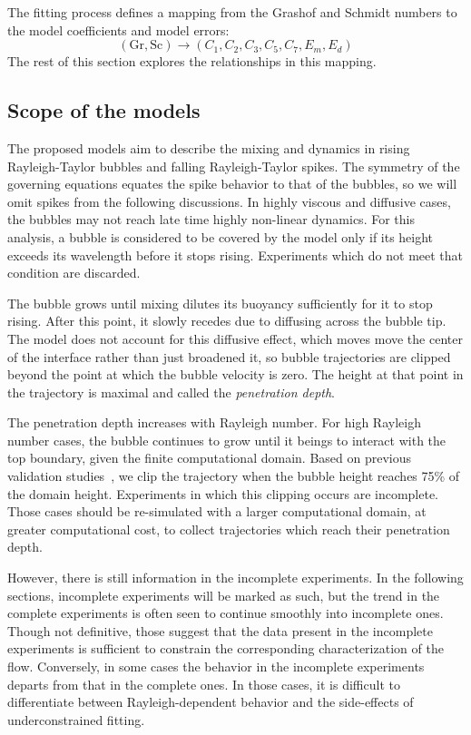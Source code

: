 The fitting process defines a mapping from the Grashof and Schmidt numbers to the model coefficients and model errors:
\begin{equation}
\left(\text{Gr}, \text{Sc}\right) \rightarrow \left(C_1, C_2, C_3, C_5, C_7, E_m, E_d\right) 
\end{equation}
The rest of this section explores the relationships in this mapping.

\subsection{Scope of the models}

The proposed models aim to describe the mixing and dynamics in rising Rayleigh-Taylor bubbles and falling Rayleigh-Taylor spikes.
The symmetry of the governing equations equates the spike behavior to that of the bubbles, so we will omit spikes from the following discussions.
In highly viscous and diffusive cases, the bubbles may not reach late time highly non-linear dynamics.
For this analysis, a bubble is considered to be covered by the model only if its height exceeds its wavelength before it stops rising.
Experiments which do not meet that condition are discarded.

The bubble grows until mixing dilutes its buoyancy sufficiently for it to stop rising.
After this point, it slowly recedes due to diffusing across the bubble tip.
The model does not account for this diffusive effect, which moves move the center of the interface rather than just broadened it, so bubble trajectories are clipped beyond the point at which the bubble velocity is zero.
The height at that point in the trajectory is maximal and called the \textit{penetration depth}.

The penetration depth increases with Rayleigh number.
For high Rayleigh number cases, the bubble continues to grow until it beings to interact with the top boundary, given the finite computational domain.
Based on previous validation studies~\cite{Hutchinson2016}, we clip the trajectory when the bubble height reaches 75\% of the domain height.
Experiments in which this clipping occurs are incomplete.
Those cases should be re-simulated with a larger computational domain, at greater computational cost, to collect trajectories which reach their penetration depth.

However, there is still information in the incomplete experiments.
In the following sections, incomplete experiments will be marked as such, but the trend in the complete experiments is often seen to continue smoothly into incomplete ones.
Though not definitive, those suggest that the data present in the incomplete experiments is sufficient to constrain the corresponding characterization of the flow.
Conversely, in some cases the behavior in the incomplete experiments departs from that in the complete ones. 
In those cases, it is difficult to differentiate between Rayleigh-dependent behavior and the side-effects of underconstrained fitting.


